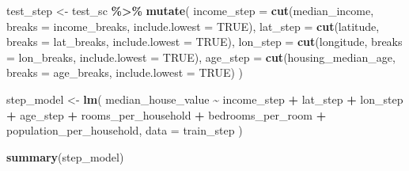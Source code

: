 \documentclass[
]{article}
\newenvironment{Shaded}{\begin{snugshade}}{\end{snugshade}}
\newcommand{\AttributeTok}[1]{\textcolor[rgb]{0.13,0.29,0.53}{#1}}
\newcommand{\ConstantTok}[1]{\textcolor[rgb]{0.56,0.35,0.01}{#1}}
\newcommand{\FunctionTok}[1]{\textcolor[rgb]{0.13,0.29,0.53}{\textbf{#1}}}
\newcommand{\NormalTok}[1]{#1}
\newcommand{\OtherTok}[1]{\textcolor[rgb]{0.56,0.35,0.01}{#1}}
\newcommand{\SpecialCharTok}[1]{\textcolor[rgb]{0.81,0.36,0.00}{\textbf{#1}}}
\begin{document}
\begin{Shaded}
\begin{Highlighting}[]
\NormalTok{test\_step }\OtherTok{\textless{}{-}}\NormalTok{ test\_sc }\SpecialCharTok{\%\textgreater{}\%}
  \FunctionTok{mutate}\NormalTok{(}
    \AttributeTok{income\_step =} \FunctionTok{cut}\NormalTok{(median\_income,      }\AttributeTok{breaks =}\NormalTok{ income\_breaks, }\AttributeTok{include.lowest =} \ConstantTok{TRUE}\NormalTok{),}
    \AttributeTok{lat\_step    =} \FunctionTok{cut}\NormalTok{(latitude,           }\AttributeTok{breaks =}\NormalTok{ lat\_breaks,    }\AttributeTok{include.lowest =} \ConstantTok{TRUE}\NormalTok{),}
    \AttributeTok{lon\_step    =} \FunctionTok{cut}\NormalTok{(longitude,          }\AttributeTok{breaks =}\NormalTok{ lon\_breaks,    }\AttributeTok{include.lowest =} \ConstantTok{TRUE}\NormalTok{),}
    \AttributeTok{age\_step    =} \FunctionTok{cut}\NormalTok{(housing\_median\_age, }\AttributeTok{breaks =}\NormalTok{ age\_breaks,    }\AttributeTok{include.lowest =} \ConstantTok{TRUE}\NormalTok{)}
\NormalTok{  )}

\NormalTok{step\_model }\OtherTok{\textless{}{-}} \FunctionTok{lm}\NormalTok{(}
\NormalTok{  median\_house\_value }\SpecialCharTok{\textasciitilde{}}
\NormalTok{    income\_step }\SpecialCharTok{+}\NormalTok{ lat\_step }\SpecialCharTok{+}\NormalTok{ lon\_step }\SpecialCharTok{+}\NormalTok{ age\_step }\SpecialCharTok{+}
\NormalTok{    rooms\_per\_household }\SpecialCharTok{+}\NormalTok{ bedrooms\_per\_room }\SpecialCharTok{+}\NormalTok{ population\_per\_household,}
  \AttributeTok{data =}\NormalTok{ train\_step}
\NormalTok{)}

\FunctionTok{summary}\NormalTok{(step\_model)}
\end{Highlighting}
\end{Shaded}
\end{document}
